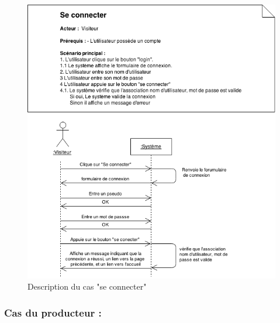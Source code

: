 \documentclass[12pt]{report}
\begin{document}
\begin{figure}[!h]
\centering
\includegraphics[width=1.\textwidth]{./ressources/desc_UC_connecter.png}
\caption{Description du cas "se connecter"}
\end{figure}
\clearpage

\subsubsection{Cas du producteur :}
\end{document}
